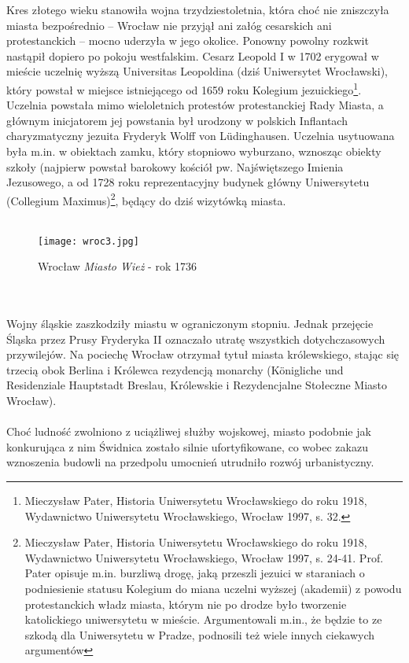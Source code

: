 \documentclass[12pt]{article}
\begin{document}
Kres złotego wieku stanowiła wojna trzydziestoletnia, która choć nie zniszczyła miasta bezpośrednio – Wrocław nie przyjął ani załóg cesarskich ani protestanckich – mocno uderzyła w jego okolice. Ponowny powolny rozkwit nastąpił dopiero po pokoju westfalskim. Cesarz Leopold I w 1702 erygował w mieście uczelnię wyższą Universitas Leopoldina (dziś Uniwersytet Wrocławski), który powstał w miejsce istniejącego od 1659 roku Kolegium jezuickiego\footnote{Mieczysław Pater, Historia Uniwersytetu Wrocławskiego do roku 1918, Wydawnictwo Uniwersytetu Wrocławskiego, Wrocław 1997, s. 32.}. Uczelnia powstała mimo wieloletnich protestów protestanckiej Rady Miasta, a głównym inicjatorem jej powstania był urodzony w polskich Inflantach charyzmatyczny jezuita Fryderyk Wolff von Lüdinghausen. Uczelnia usytuowana była m.in. w obiektach zamku, który stopniowo wyburzano, wznosząc obiekty szkoły (najpierw powstał barokowy kościół pw. Najświętszego Imienia Jezusowego, a od 1728 roku reprezentacyjny budynek główny Uniwersytetu (Collegium Maximus)\footnote{Mieczysław Pater, Historia Uniwersytetu Wrocławskiego do roku 1918, Wydawnictwo Uniwersytetu Wrocławskiego, Wrocław 1997, s. 24-41. Prof. Pater opisuje m.in. burzliwą drogę, jaką przeszli jezuici w staraniach o podniesienie statusu Kolegium do miana uczelni wyższej (akademii) z powodu protestanckich władz miasta, którym nie po drodze było tworzenie katolickiego uniwersytetu w mieście. Argumentowali m.in., że będzie to ze szkodą dla Uniwersytetu w Pradze, podnosili też wiele innych ciekawych argumentów}, będący do dziś wizytówką miasta.\\\\
\begin{figure}[h]
    \centering
    \texttt{[image: wroc3.jpg]}
    \caption{Wrocław \textit{Miasto Wież} - rok 1736} 
    \label{fig:wroc3}
\end{figure}\\\\
Wojny śląskie zaszkodziły miastu w ograniczonym stopniu. Jednak przejęcie Śląska przez Prusy Fryderyka II oznaczało utratę wszystkich dotychczasowych przywilejów. Na pociechę Wrocław otrzymał tytuł miasta królewskiego, stając się trzecią obok Berlina i Królewca rezydencją monarchy (Königliche und Residenziale Hauptstadt Breslau, Królewskie i Rezydencjalne Stołeczne Miasto Wrocław).\\\\
Choć ludność zwolniono z uciążliwej służby wojskowej, miasto podobnie jak konkurująca z nim Świdnica zostało silnie ufortyfikowane, co wobec zakazu wznoszenia budowli na przedpolu umocnień utrudniło rozwój urbanistyczny. 
\end{document}
